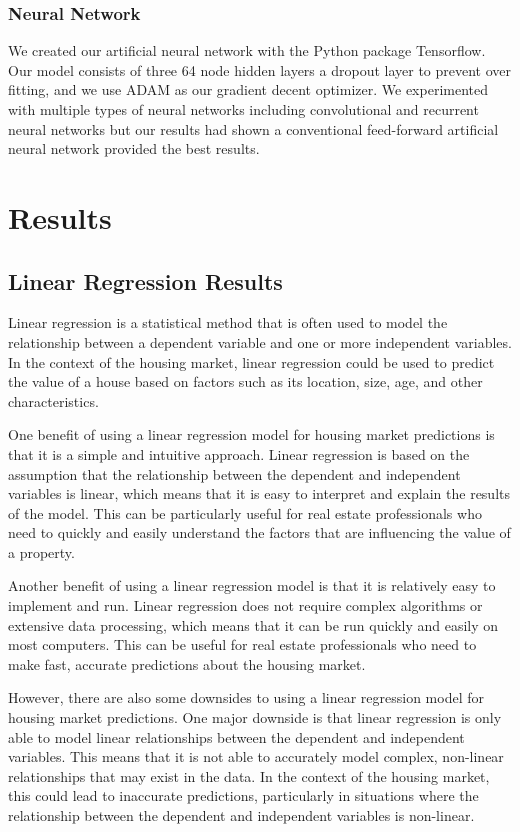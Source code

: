 \documentclass[11pt]{article}
\begin{document}
\subsubsection{Neural Network}

We created our artificial neural network with the Python package Tensorflow. Our model consists of three 64 node hidden layers a dropout layer to prevent over fitting, and we use ADAM as our gradient decent optimizer. 
We experimented with multiple types of neural networks including convolutional and recurrent neural networks but our results had shown a conventional feed-forward artificial neural network provided the best results. 

\section{Results}
\subsection{Linear Regression Results}
Linear regression is a statistical method that is often used to model the relationship between a dependent variable and one or more independent variables. In the context of the housing market, linear regression could be used to predict the value of a house based on factors such as its location, size, age, and other characteristics.

One benefit of using a linear regression model for housing market predictions is that it is a simple and intuitive approach. Linear regression is based on the assumption that the relationship between the dependent and independent variables is linear, which means that it is easy to interpret and explain the results of the model. This can be particularly useful for real estate professionals who need to quickly and easily understand the factors that are influencing the value of a property.

Another benefit of using a linear regression model is that it is relatively easy to implement and run. Linear regression does not require complex algorithms or extensive data processing, which means that it can be run quickly and easily on most computers. This can be useful for real estate professionals who need to make fast, accurate predictions about the housing market.

However, there are also some downsides to using a linear regression model for housing market predictions. One major downside is that linear regression is only able to model linear relationships between the dependent and independent variables. This means that it is not able to accurately model complex, non-linear relationships that may exist in the data. In the context of the housing market, this could lead to inaccurate predictions, particularly in situations where the relationship between the dependent and independent variables is non-linear.
\end{document}
